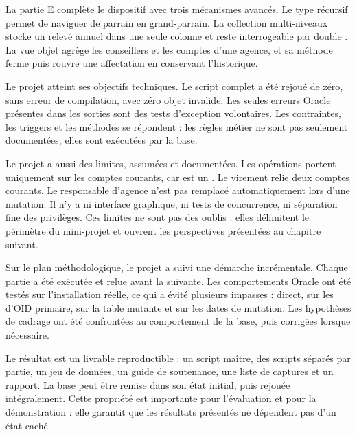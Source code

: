 La partie E complète le dispositif avec trois mécanismes avancés. Le type
récursif permet de naviguer de parrain en grand-parrain. La collection
multi-niveaux stocke un relevé annuel dans une seule colonne et reste
interrogeable par double . La vue objet agrège les conseillers et
les comptes d'une agence, et sa méthode  ferme puis rouvre une
affectation en conservant l'historique.

Le projet atteint ses objectifs techniques. Le script complet a été rejoué de
zéro, sans erreur de compilation, avec zéro objet invalide. Les seules erreurs
Oracle présentes dans les sorties sont des tests d'exception volontaires. Les
contraintes, les triggers et les méthodes se répondent : les règles métier ne
sont pas seulement documentées, elles sont exécutées par la base.

Le projet a aussi des limites, assumées et documentées. Les opérations portent
uniquement sur les comptes courants, car 
est un . Le virement relie deux comptes courants.
Le responsable d'agence n'est pas remplacé automatiquement lors d'une mutation.
Il n'y a ni interface graphique, ni tests de concurrence, ni séparation fine
des privilèges. Ces limites ne sont pas des oublis : elles délimitent le
périmètre du mini-projet et ouvrent les perspectives présentées au chapitre
suivant.

Sur le plan méthodologique, le projet a suivi une démarche incrémentale. Chaque
partie a été exécutée et relue avant la suivante. Les comportements Oracle ont
été testés sur l'installation réelle, ce qui a évité plusieurs impasses :
 direct,  sur les  d'OID primaire,
 sur la table mutante et  sur les dates de
mutation. Les hypothèses de cadrage ont été confrontées au comportement de la
base, puis corrigées lorsque nécessaire.

Le résultat est un livrable reproductible : un script maître, des scripts
séparés par partie, un jeu de données, un guide de soutenance, une liste de
captures et un rapport. La base peut être remise dans son état initial, puis
rejouée intégralement. Cette propriété est importante pour l'évaluation et
pour la démonstration : elle garantit que les résultats présentés ne dépendent
pas d'un état caché.
